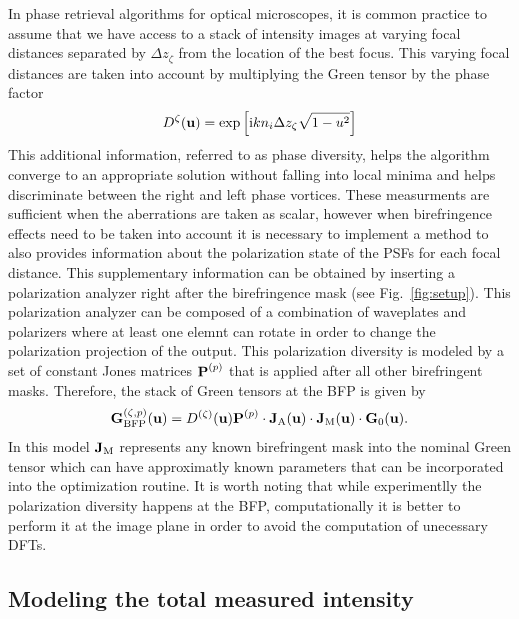 \documentclass[reprint,aps,pra,superscriptaddress,
amsmath,amssymb]{revtex4-1}
\begin{document}
In phase retrieval algorithms for optical microscopes, it is common 
practice to assume that we have access to a stack of intensity images 
at varying focal distances separated by $\Delta z_{\zeta}$ from the 
location of the best focus. This varying focal 
distances are taken into account by multiplying the Green tensor by 
the phase factor
\begin{align}
D^\zeta (\textbf u) =  \exp \left[ \text{i} k n_i \Delta z_\zeta  \sqrt{1 - u^2} \right] 
\end{align}
This additional information, referred to as phase diversity, helps the 
algorithm converge to an appropriate solution without falling into 
local minima and helps discriminate between the right and left phase vortices. 
These measurments are sufficient when the aberrations are taken as 
scalar, however when birefringence effects need to be taken into account 
it is necessary to implement a method to also provides information 
about the polarization state of the PSFs for each focal distance. 
This supplementary information can be obtained by inserting a polarization 
analyzer right after the 
birefringence mask (see Fig.~\ref{fig:setup}). This polarization analyzer 
can be composed of a combination of waveplates and polarizers where at least
one elemnt can rotate in order to change the polarization projection of 
the output. This polarization diversity is modeled by a set of constant 
Jones matrices $\textbf P^{(p)}$ that is applied after all other birefringent masks.
Therefore, the stack of Green tensors at the BFP is given by
\begin{align}
\textbf G^{(\zeta ,p)}_\text{BFP} (\textbf u) =  D^{(\zeta )} (\textbf u) \textbf P^{(p)} 
\cdot \textbf J_\text{A}(\textbf u) \cdot \textbf J_\text{M}(\textbf u) \cdot \textbf G_0  (\textbf u).
\end{align}
In this model $\textbf J_\text{M}$ represents any known
birefringent mask into the nominal Green tensor which can have approximatly known
parameters that can be incorporated into the optimization routine.
It is worth noting that while experimentlly the polarization diversity happens at 
the BFP, computationally it is better to perform it at the image plane in 
order to avoid the computation of unecessary DFTs.


\subsection{Modeling the total measured intensity}
\end{document}
